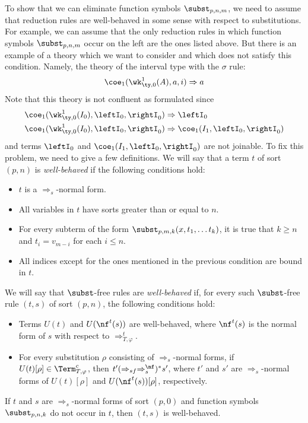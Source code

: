 To show that we can eliminate function symbols $\subst_{p,n,m}$, we need to assume that reduction rules are well-behaved in some sense with respect to substitutions.
For example, we can assume that the only reduction rules in which function symbols $\subst_{p,n,m}$ occur on the left are the ones listed above.
But there is an example of a theory which we want to consider and which does not satisfy this condition.
Namely, the theory of the interval type with the $\sigma$ rule:
\[ \coe_1(\wk^1_{\ty,0}(A), a, i) \Rightarrow a \]
Note that this theory is not confluent as formulated since
\begin{align*}
\coe_1(\wk^1_{\ty,0}(I_0), \leftI_0, \rightI_0) & \Rightarrow \leftI_0 \\
\coe_1(\wk^1_{\ty,0}(I_0), \leftI_0, \rightI_0) & \Rightarrow \coe_1(I_1, \leftI_0, \rightI_0)
\end{align*}
and terms $\leftI_0$ and $\coe_1(I_1, \leftI_0, \rightI_0)$ are not joinable.
To fix this problem, we need to give a few definitions.
We will say that a term $t$ of sort $(p,n)$ is \emph{well-behaved} if the following conditions hold:
\begin{itemize}
\item $t$ is a $\Rightarrow_s$-normal form.
\item All variables in $t$ have sorts greater than or equal to $n$.
\item For every subterm of the form $\subst_{p,m,k}(x, t_1, \ldots t_k)$, it is true that $k \geq n$ and $t_i = v_{m-i}$ for each $i \leq n$.
\item All indices except for the ones mentioned in the previous condition are bound in $t$.
\end{itemize}
We will say that $\subst$-free rules are \emph{well-behaved} if, for every such $\subst$-free rule $(t,s)$ of sort $(p,n)$, the following conditions hold:
\begin{itemize}
\item Terms $U(t)$ and $U(\nf^t(s))$ are well-behaved, where $\nf^t(s)$ is the normal form of $s$ with respect to $\Rightarrow_{T,\varphi}^t$.
\item For every substitution $\rho$ consisting of $\Rightarrow_s$-normal forms, if $U(t)[\rho] \in \Term_{T,\varphi}^c$, then $t' (\Rightarrow_{sf} \Rightarrow_s^\nf)^* s'$,
where $t'$ and $s'$ are $\Rightarrow_s$-normal forms of $U(t)[\rho]$ and $U(\nf^t(s))[\rho]$, respectively.
\end{itemize}

\begin{example}
If $t$ and $s$ are $\Rightarrow_s$-normal forms of sort $(p,0)$ and function symbols $\subst_{p,n,k}$ do not occur in $t$, then $(t,s)$ is well-behaved.
\end{example}

